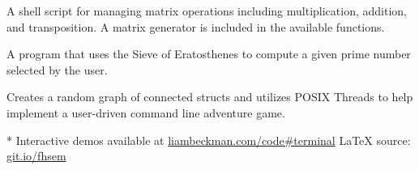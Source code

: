 \myBreak


A shell script for managing matrix operations including multiplication, addition, and transposition. A matrix generator is included in the available functions.

\myBreak


A program that uses the Sieve of Eratosthenes to compute a given prime number selected by the user.

\myBreak


Creates a random graph of connected structs and utilizes POSIX Threads to help implement a user-driven command line adventure game.


\vfill
* Interactive demos available at \textcolor{my-blue}{\href{https://liambeckman.com/code\#terminal}{liambeckman.com/code\#terminal}}
\hfill\textcolor{my-red}{\LaTeX{} source: \href{https://git.io/fhsem}{git.io/fhsem}}


